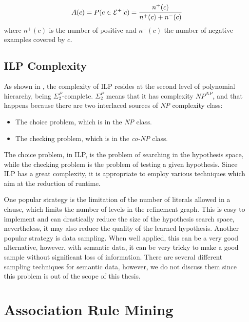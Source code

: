 \begin{equation}
A(c)=P(e \in \mathcal{E}^{+}|c)=\cfrac{n^{+}(c)}{n^{+}(c)+n^{-}(c)} 
\end{equation}
where $n^{+}(c)$ is the number of positive and $n^{-}(c)$ the number of negative examples covered by $c$. 

\subsection{ILP Complexity}

As shown in \citet{DBLP:journals/ngc/GottlobLS99}, the complexity of ILP resides at the second level of polynomial
hierarchy, being $\Sigma_2^P$-complete. $\Sigma_2^P$ means that it has complexity $NP^{NP}$, and that happens
because there are two interlaced sources of \emph{NP} complexity class:
\begin{itemize}
 \item The choice problem, which is in the \emph{NP} class.
 \item The checking problem, which is in the \emph{co-NP} class.
\end{itemize}

The choice problem, in ILP, is the problem of searching in the hypothesis space, while the checking problem is the
problem of testing a given hypothesis. Since ILP has a great complexity, it is appropriate to employ various techniques
which aim at the reduction of runtime.

One popular strategy is the limitation of the number of literals allowed in a clause, which limits the number of
levels in the refinement graph. This is easy to implement and can drastically reduce the size of the hypothesis search
space, nevertheless, it may also reduce the quality of the learned hypothesis. Another popular strategy is data
sampling. When well applied, this can be a very good alternative, however, with semantic data, it can be very tricky to
make a good sample without significant loss of information. There are several different sampling techniques for semantic
data, however, we do not discuss them since this problem is out of the scope of this thesis.


\section{Association Rule Mining}
\label{sec:rw-arm}

